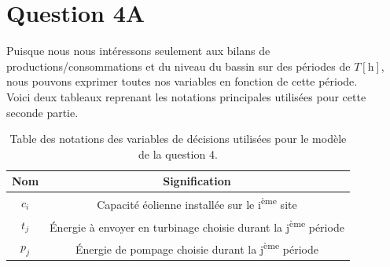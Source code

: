 \documentclass{article}
\newcommand{\unit}[1]{[\mathrm{#1}]}
\begin{document}
\section*{Question 4A}
Puisque nous nous intéressons seulement aux bilans de productions/consommations et du niveau du bassin
sur des périodes de $T \unit{h}$, nous pouvons exprimer toutes nos variables en fonction de cette période.\\
Voici deux tableaux reprenant les notations principales utilisées pour cette seconde partie.
\begin{table}[H]
    \centering
    \renewcommand{\arraystretch}{1.5}%
    \begin{tabular}{|c || c |} 
        \hline
        Nom & Signification\\
        \hline\hline
        $c_i$ & Capacité éolienne installée sur le i\textsuperscript{ème} site\\
        $t_j$ & Énergie à envoyer en turbinage choisie durant la j\textsuperscript{ème} période\\
        $p_j$ & Énergie de pompage choisie durant la j\textsuperscript{ème} période\\
        \hline
    \end{tabular}
    \caption{Table des notations des variables de décisions utilisées pour le modèle de la question 4.}
    \label{table:notations_variables_4}
\end{table} 
\end{document}
